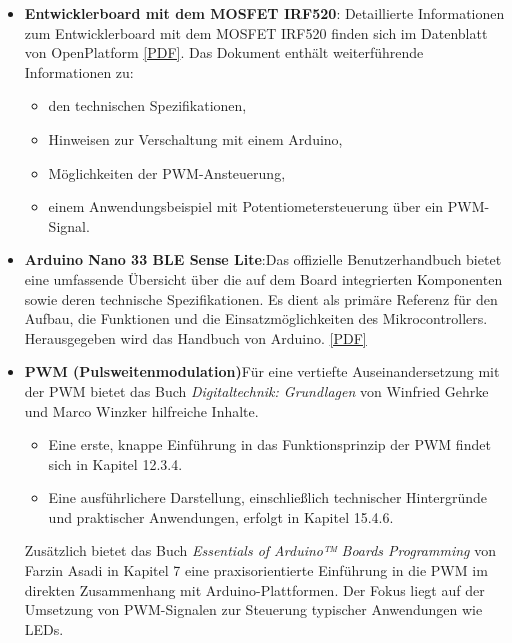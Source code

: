 \begin{itemize}
	\item \textbf{Entwicklerboard mit dem MOSFET IRF520}: Detaillierte Informationen zum Entwicklerboard mit dem MOSFET IRF520 finden sich im Datenblatt von OpenPlatform \cite{OpenPlatform.cc.2020} \href{../../../Documents/Datenblaetter/DatenblattMOSFETIRF520.pdf}{[PDF]}. 
	Das Dokument enthält weiterführende Informationen zu:
	\begin{itemize}
		\item den technischen Spezifikationen,
		\item Hinweisen zur Verschaltung mit einem Arduino,
		\item Möglichkeiten der PWM-Ansteuerung,
		\item einem Anwendungsbeispiel mit Potentiometersteuerung über ein PWM-Signal.
	\end{itemize}
	
	\item \textbf{Arduino Nano 33 BLE Sense Lite}:Das offizielle Benutzerhandbuch bietet eine umfassende Übersicht über die auf dem Board integrierten Komponenten sowie deren technische Spezifikationen. Es dient als primäre Referenz für den Aufbau, die Funktionen und die Einsatzmöglichkeiten des Mikrocontrollers. Herausgegeben wird das Handbuch von Arduino. \cite{Arduino.2025b} \href{../../../Documents/Datenblaetter/DatenblattArduino}{[PDF]}
	
	\item \textbf{PWM (Pulsweitenmodulation)}Für eine vertiefte Auseinandersetzung mit der PWM bietet das Buch \glqq \textit{Digitaltechnik: Grundlagen}\grqq \cite{Gehrke.2022} von Winfried Gehrke und Marco Winzker hilfreiche Inhalte.  
	\begin{itemize}
		\item Eine erste, knappe Einführung in das Funktionsprinzip der PWM findet sich in Kapitel 12.3.4.
		\item  Eine ausführlichere Darstellung, einschließlich technischer Hintergründe und praktischer Anwendungen, erfolgt in Kapitel 15.4.6.
	\end{itemize}  
	
	Zusätzlich bietet das Buch \glqq \textit{Essentials of Arduino™ Boards Programming}\grqq \cite{Asadi.2023} von Farzin Asadi in Kapitel 7 eine praxisorientierte Einführung in die PWM im direkten Zusammenhang mit Arduino-Plattformen. Der Fokus liegt auf der Umsetzung von PWM-Signalen zur Steuerung typischer Anwendungen wie LEDs. 
	
	
	
\end{itemize}



